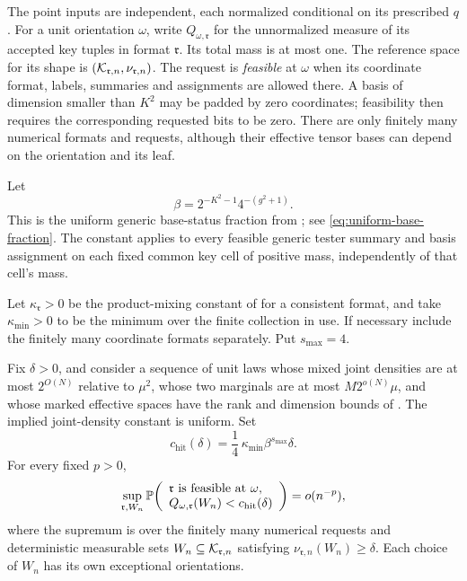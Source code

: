 The point inputs are independent, each normalized conditional on its
prescribed \(q\).  For a unit orientation \(\omega\), write
\(Q_{\omega,\mathfrak r}\) for the unnormalized measure of its accepted
key tuples in format \(\mathfrak r\).  Its total mass is at most one.
The reference space for its shape is
\((\mathcal K_{\mathfrak r,n},\nu_{\mathfrak r,n})\).
The request is \emph{feasible} at \(\omega\) when its coordinate format,
labels, summaries and assignments are allowed there.  A basis of
dimension smaller than \(K^2\) may be padded by zero coordinates;
feasibility then requires the corresponding requested bits to be zero.
There are only finitely many numerical formats and requests, although
their effective tensor bases can depend on the orientation and its leaf.

Let
\begin{equation}
 \beta=2^{-K^2-1}4^{-(g^2+1)}.
 \label{eq:rare-base-beta}
\end{equation}
This is the uniform generic base-status fraction from
; see \eqref{eq:uniform-base-fraction}.
The constant applies to every feasible generic tester summary and
basis assignment on each fixed common key cell of positive mass,
independently of that cell's mass.

Let \(\kappa_{\mathfrak r}>0\) be the product-mixing constant of
 for a consistent format, and take
\(\kappa_{\min}>0\) to be the minimum over the finite collection in use.
If necessary include the finitely many coordinate formats separately.
Put \(s_{\max}=4\).

\begin{lemma}
\label{lem:rare-large-set-hit}
Fix \(\delta>0\), and consider a sequence of unit laws whose mixed
joint densities are at most \(2^{O(N)}\) relative to \(\mu^2\), whose
two marginals are at most \(M2^{o(N)}\mu\), and whose marked effective
spaces have the rank and dimension bounds of .
The implied joint-density constant is uniform.
Set
\begin{equation}
 c_{\mathrm{hit}}(\delta)
   =\frac14\,\kappa_{\min}\beta^{s_{\max}}\delta.
 \label{eq:rare-hit-threshold}
\end{equation}
For every fixed \(p>0\),
\begin{equation}
 \sup_{\mathfrak r,W_n}
 \mathbb P\!\left(
 \begin{array}{l}
 \mathfrak r\text{ is feasible at }\omega,\\
 Q_{\omega,\mathfrak r}(W_n)<c_{\mathrm{hit}}(\delta)
 \end{array}\right)
 =o(n^{-p}),
 \label{eq:rare-superpolynomial-tail}
\end{equation}
where the supremum is over the finitely many numerical requests
and deterministic measurable sets
\(W_n\subseteq\mathcal K_{\mathfrak r,n}\) satisfying
\(\nu_{\mathfrak r,n}(W_n)\ge\delta\).
Each choice of \(W_n\) has its own exceptional orientations.
\end{lemma}

